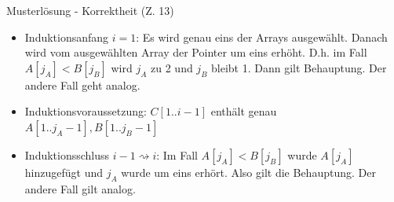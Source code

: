 \documentclass[18pt]{beamer}
\begin{document}
\begin{frame}{Musterlösung - Korrektheit (Z. 13)}
\begin{itemize}
 \item Induktionsanfang $i=1$: Es wird genau eins der Arrays ausgewählt. Danach wird vom ausgewählten Array der Pointer um eins erhöht. D.h. im Fall $A[j_A] < B[j_B]$ wird $j_A$ zu 2 und $j_B$ bleibt 1. Dann gilt Behauptung. Der andere Fall geht analog.
 \item Induktionsvoraussetzung: $C[1..i-1]$ enthält genau $A[1..j_A-1], B[1..j_B-1]$ 
 \item 	Induktionsschluss $i-1 \rightsquigarrow i$: Im Fall $A[j_A] < B[j_B]$ wurde $A[j_A]$ hinzugefügt und $j_A$ wurde um eins erhört. Also gilt die Behauptung. Der andere Fall gilt analog.
\end{itemize}	
\end{frame}
\end{document}
